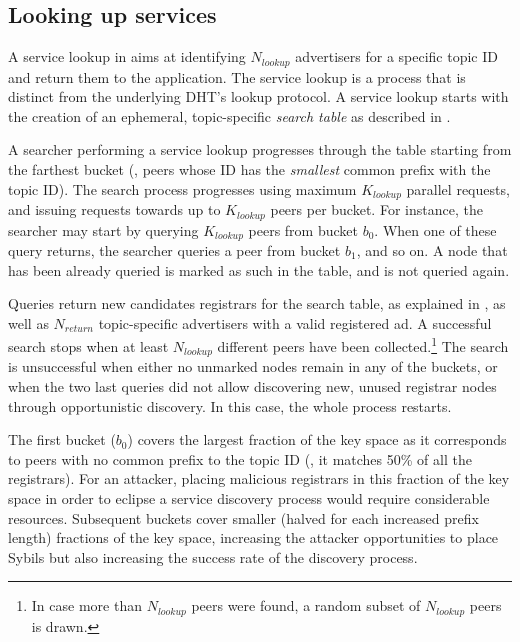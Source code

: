 \subsection{Looking up services}
\label{sec:lookup}

A service lookup in \sysname aims at identifying $N_\textit{lookup}$ advertisers for a specific topic ID and return them to the application.
The service lookup is a process that is distinct from the underlying DHT's lookup protocol.
A service lookup starts with the creation of an ephemeral, topic-specific \emph{search table} as described in .

A searcher performing a service lookup progresses through the table starting from the farthest bucket (\ie, peers whose ID has the \emph{smallest} common prefix with the topic ID).
The search process progresses using maximum $K_\textit{lookup}$ parallel requests, and issuing requests towards up to $K_\textit{lookup}$ peers per bucket.
For instance, the searcher may start by querying $K_\textit{lookup}$ peers from bucket $b_0$.
When one of these query returns, the searcher queries a peer from bucket $b_1$, and so on.
A node that has been already queried is marked as such in the table, and is not queried again.

Queries return new candidates registrars for the search table, as explained in , as well as $N_\textit{return}$ topic-specific advertisers with a valid registered ad.
A successful search stops when at least $N_\textit{lookup}$ different peers have been collected.\footnote{In case more than $N_\textit{lookup}$ peers were found, a random subset of $N_\textit{lookup}$ peers is drawn.}
The search is unsuccessful when either no unmarked nodes remain in any of the buckets, or when the two last queries did not allow discovering new, unused registrar nodes through opportunistic discovery.
In this case, the whole process restarts.

The first bucket ($b_0$) covers the largest fraction of the key space as it corresponds to peers with no common prefix to the topic ID (\ie, it matches 50\% of all the registrars).
For an attacker, placing malicious registrars in this fraction of the key space in order to eclipse a service discovery process would require considerable resources.
Subsequent buckets cover smaller (halved for each increased prefix length) fractions of the key space, increasing the attacker opportunities to place Sybils but also increasing the success rate of the discovery process.

